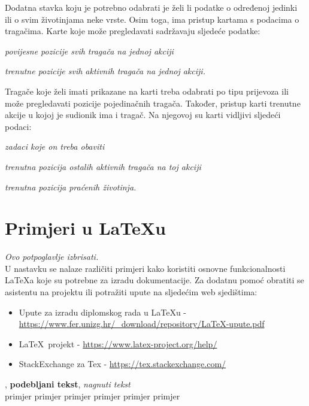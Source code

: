 		Dodatna stavka koju je potrebno odabrati je želi li podatke o određenoj jedinki ili o svim životinjama neke vrste. 
		Osim toga, ima pristup kartama s podacima o tragačima. Karte koje može pregledavati sadržavaju sljedeće podatke:
		\begin{packed_item}
			\item \textit{povijesne pozicije svih tragača na jednoj akciji}
			\item \textit{trenutne pozicije svih aktivnih tragača na jednoj akciji.}
		\end{packed_item}
		
		Tragače koje želi imati prikazane na karti treba odabrati po tipu prijevoza ili može pregledavati pozicije pojedinačnih tragača.
		Također, pristup karti trenutne akcije u kojoj je sudionik ima i tragač.
		Na njegovoj su karti vidljivi sljedeći podaci:
		\begin{packed_item}
			\item \textit{zadaci koje on treba obaviti}
			\item \textit{trenutna pozicija ostalih aktivnih tragača na toj akciji}
			\item \textit{trenutna pozicija praćenih životinja.}
		\end{packed_item}
		
		\section{Primjeri u \LaTeX u}
		
		\textit{Ovo potpoglavlje izbrisati.}\\

		U nastavku se nalaze različiti primjeri kako koristiti osnovne funkcionalnosti \LaTeX a koje su potrebne za izradu dokumentacije. Za dodatnu pomoć obratiti se asistentu na projektu ili potražiti upute na sljedećim web sjedištima:
		\begin{itemize}
			\item Upute za izradu diplomskog rada u \LaTeX u - \url{https://www.fer.unizg.hr/_download/repository/LaTeX-upute.pdf}
			\item \LaTeX\ projekt - \url{https://www.latex-project.org/help/}
			\item StackExchange za Tex - \url{https://tex.stackexchange.com/}\\
		
		\end{itemize} 	


		
		\noindent {}, \textbf{podebljani tekst}, 	\textit{nagnuti tekst}\\
		\noindent \normalsize primjer \large primjer \Large primjer \LARGE {primjer} \huge {primjer} \Huge primjer \normalsize
				
